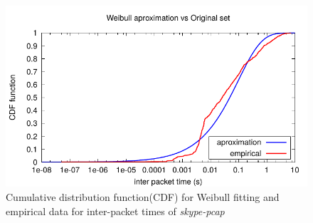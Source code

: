 \begin{figure}[ht!]
{\centering
\includegraphics[width=\columnwidth]{figures/Weibull}
\caption{Cumulative distribution function(CDF) for Weibull fitting and empirical data for inter-packet times of \textit{skype-pcap}}
\label{fig:skype-weibull}\par}
\end{figure}

